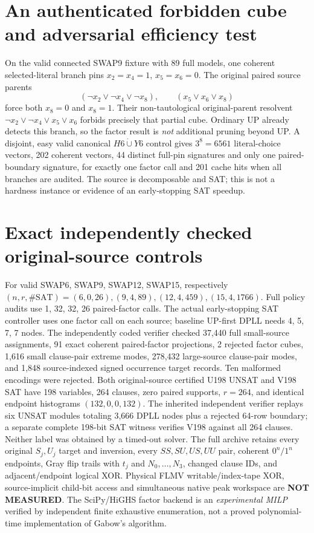 \documentclass[11pt]{article}
\begin{document}
\section{An authenticated forbidden cube and adversarial efficiency test}
On the valid connected SWAP9 fixture with 89 full models, one coherent selected-literal branch pins $x_2=x_4=1$, $x_5=x_6=0$. The original paired source parents
\[
(\neg x_2\vee\neg x_4\vee\neg x_8),\qquad(x_5\vee x_6\vee x_8)
\]
force both $x_8=0$ and $x_8=1$. Their non-tautological original-parent resolvent $\neg x_2\vee\neg x_4\vee x_5\vee x_6$ forbids precisely that partial cube. Ordinary UP already detects this branch, so the factor result is \emph{not} additional pruning beyond UP.
A disjoint, easy valid canonical $H6\dot\cup Y6$ control gives $3^8=6561$ literal-choice vectors, 202 coherent vectors, 44 distinct full-pin signatures and only one paired-boundary signature, for exactly one factor call and 201 cache hits when all branches are audited. The source is decomposable and SAT; this is not a hardness instance or evidence of an early-stopping SAT speedup.
\section{Exact independently checked original-source controls}
For valid SWAP6, SWAP9, SWAP12, SWAP15, respectively $(n,r,\#\mathrm{SAT})=(6,0,26),(9,4,89),(12,4,459),(15,4,1766)$. Full policy audits use 1, 32, 32, 26 paired-factor calls. The actual early-stopping SAT controller uses one factor call on each source; baseline UP-first DPLL needs 4, 5, 7, 7 nodes. The independently coded verifier checked 37,440 full small-source assignments, 91 exact coherent paired-factor projections, 2 rejected factor cubes, 1,616 small clause-pair extreme modes, 278,432 large-source clause-pair modes, and 1,848 source-indexed signed occurrence target records. Ten malformed encodings were rejected.
Both original-source certified U198 UNSAT and V198 SAT have 198 variables, 264 clauses, zero paired supports, $r=264$, and identical endpoint histograms $(132,0,0,132)$. The inherited independent verifier replays six UNSAT modules totaling 3,666 DPLL nodes plus a rejected 64-row boundary; a separate complete 198-bit SAT witness verifies V198 against all 264 clauses. Neither label was obtained by a timed-out solver.
The full archive retains every original $S_j,U_j$ target and inversion, every $SS,SU,US,UU$ pair, coherent $0^n/1^n$ endpoints, Gray flip trails with $t_j$ and $N_0,\dots,N_3$, changed clause IDs, and adjacent/endpoint logical XOR. Physical FLMV writable/index-tape XOR, source-implicit child-bit access and simultaneous native peak workspace are \textbf{NOT MEASURED}. The SciPy/HiGHS factor backend is an \emph{experimental MILP} verified by independent finite exhaustive enumeration, not a proved polynomial-time implementation of Gabow's algorithm.
\end{document}
